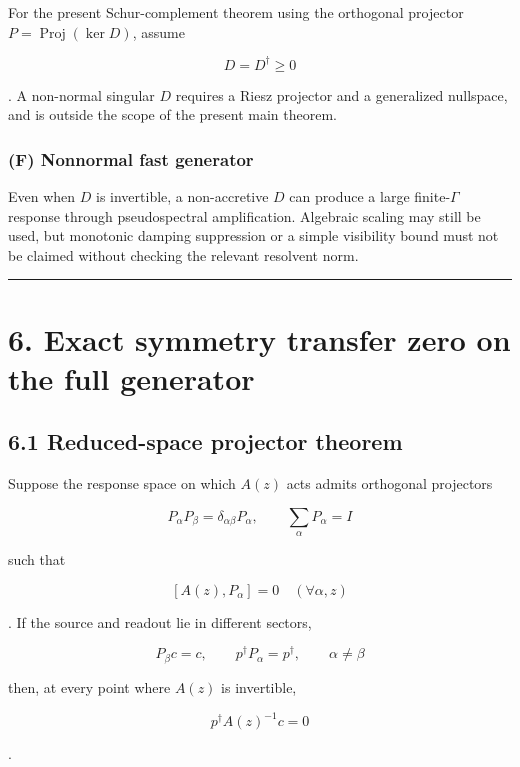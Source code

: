 \documentclass[
  10pt,
  a4paper,
]{article}
\begin{document}
For the present Schur-complement theorem using the orthogonal projector
\(P=\operatorname{Proj}(\ker D)\), assume

\[
\boxed{D=D^\dagger\ge0}
\]

. A non-normal singular \(D\) requires a Riesz projector and a
generalized nullspace, and is outside the scope of the present main
theorem.

\subsubsection{(F) Nonnormal fast
generator}\label{f-nonnormal-fast-generator}

Even when \(D\) is invertible, a non-accretive \(D\) can produce a large
finite-\(\Gamma\) response through pseudospectral amplification.
Algebraic scaling may still be used, but monotonic damping suppression
or a simple visibility bound must not be claimed without checking the
relevant resolvent norm.

\begin{center}\rule{0.5\linewidth}{0.5pt}\end{center}

\section{6. Exact symmetry transfer zero on the full
generator}\label{exact-symmetry-transfer-zero-on-the-full-generator}

\subsection{6.1 Reduced-space projector
theorem}\label{reduced-space-projector-theorem}

Suppose the response space on which \(A(z)\) acts admits orthogonal
projectors

\[
P_\alpha P_\beta=\delta_{\alpha\beta}P_\alpha,
\qquad
\sum_\alpha P_\alpha=I
\]

such that

\[
\boxed{[A(z),P_\alpha]=0\quad(\forall\alpha,z)}
\]

. If the source and readout lie in different sectors,

\[
P_\beta c=c,
\qquad
p^\dagger P_\alpha=p^\dagger,
\qquad
\alpha\neq\beta
\]

then, at every point where \(A(z)\) is invertible,

\[
\boxed{p^\dagger A(z)^{-1}c=0}
\]

.
\end{document}
